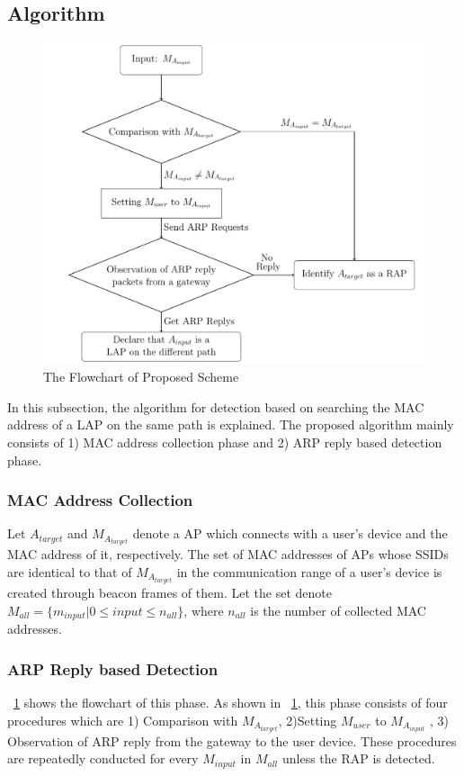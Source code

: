 \documentclass[conference]{IEEEtran}
\newcommand{\tarMAC}{M_{A_{target}}}
\newcommand{\userMAC}{M_{user}}
\newcommand{\tarAP}{A_{target}}
\begin{document}
\subsection{Algorithm}
\begin{figure}[t]
    \begin{center}
        \includegraphics[scale=0.45]{image/flowchart.pdf}
        \caption{The Flowchart of Proposed Scheme}
        \label{fig:flowchart}
    \end{center}
\end{figure}
In this subsection, the algorithm for detection based on searching the MAC address of a LAP on the same path is explained.
The proposed algorithm mainly consists of 1) MAC address collection phase and 2) ARP reply based detection phase. 

\subsubsection{MAC Address Collection}
Let $\tarAP$ and $M_{\tarAP}$ denote a AP which connects with a user's device and the MAC address of it, respectively.
The set of MAC addresses of APs whose SSIDs are identical to that of $\tarMAC$  in the communication range of a user's device is created through beacon frames of them. 
Let the set denote $M_{all}=\{m_{input}|0\le input \le n_{all}  \}$, where $n_{all}$ is the number of collected MAC addresses.

\subsubsection{ARP Reply based Detection}
\figurename~\ref{fig:flowchart} shows the flowchart of this phase.
As shown in \figurename~\ref{fig:flowchart}, this phase consists of four procedures which are 1) Comparison with $\tarMAC$, 2)Setting $\userMAC$ to \newcommand{\inputMAC}{M_{A_{input}}}$\inputMAC$ , 3) Observation of ARP reply from the gateway to the user device.
These procedures are repeatedly conducted for every $M_{input}$ in $M_{all}$ unless the RAP is detected.
\end{document}
